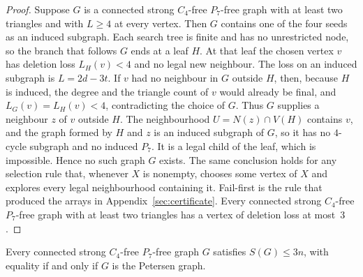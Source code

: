 \documentclass[ASNA]{USG}
\theoremstyle{WBstyletwo}
\numberwithin{equation}{section}
\begin{document}
\begin{proof}
Suppose $G$ is a connected strong $C_4$-free $P_7$-free graph with at least two triangles and with $L\ge 4$ at every vertex. Then $G$ contains one of the four seeds as an induced subgraph. Each search tree is finite and has no unrestricted node, so the branch that follows $G$ ends at a leaf $H$. At that leaf the chosen vertex $v$ has deletion loss $L_H(v)<4$ and no legal new neighbour. The loss on an induced subgraph is $L=2d-3t$. If $v$ had no neighbour in $G$ outside $H$, then, because $H$ is induced, the degree and the triangle count of $v$ would already be final, and $L_G(v)=L_H(v)<4$, contradicting the choice of $G$. Thus $G$ supplies a neighbour $z$ of $v$ outside $H$. The neighbourhood $U=N(z)\cap V(H)$ contains $v$, and the graph formed by $H$ and $z$ is an induced subgraph of $G$, so it has no $4$-cycle subgraph and no induced $P_7$. It is a legal child of the leaf, which is impossible. Hence no such graph $G$ exists. The same conclusion holds for any selection rule that, whenever $X$ is nonempty, chooses some vertex of $X$ and explores every legal neighbourhood containing it. Fail-first is the rule that produced the arrays in Appendix~\ref{sec:certificate}. Every connected strong $C_4$-free $P_7$-free graph with at least two triangles has a vertex of deletion loss at most~$3$.
\end{proof}

\begin{theorem}\label{thm:gen3}
Every connected strong $C_4$-free $P_7$-free graph $G$ satisfies $S(G)\le 3n$, with equality if and only if $G$ is the Petersen graph.
\end{theorem}
\end{document}

